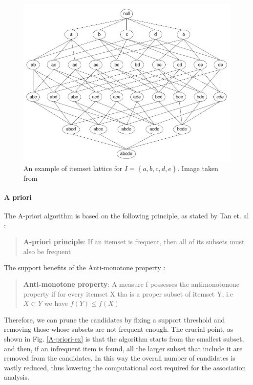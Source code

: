 \documentclass[12pt,%
               a4paper,%
               oneside,openany,%
               titlepage,%
               headinclude,footinclude,%
               BCOR5mm,%
               cleardoublepage=empty,%
               tablecaptionabove,%
               floatperchapter,
               ]{scrreprt}                 %
\begin{document}
\begin{figure}
\begin{center}
\includegraphics[width=\textwidth]{Figures/itemset_lattice.jpg}
\caption{An example of itemset lattice for $I=\left\lbrace a,b,c,d,e\right\rbrace$. Image taken from \cite{tan2019introduction}}
\label{itemset_lattice}
\end{center}
\end{figure}

\paragraph{A priori}

The A-priori algorithm is based on the following principle, as stated by Tan et. al \cite{tan2019introduction}:

\begin{quote}
\textbf{A-priori principle}: If an itemset is frequent, then all of its subsets must also be frequent
\end{quote}

The support benefits of the Anti-monotone property \cite{tan2019introduction}:

\begin{quote}
\textbf{Anti-monotone property}: A measure f possesses the antimonotonone property if for every itemset X tha is a proper subset of itemset Y, i.e $X \subset Y $ we have $f(Y) \leq f(X) $
\end{quote}

Therefore, we can prune the candidates by fixing a support threshold and removing those whose subsets are not frequent enough. The crucial point, as shown in Fig. \ref{A-priori-ex} is that the algorithm starts from the smallest subset, and then, if an infrequent item is found, all the larger subset that include it are removed from the candidates. In this way the overall number of candidates is vastly reduced, thus lowering the computational cost required for the association analysis.
\end{document}
